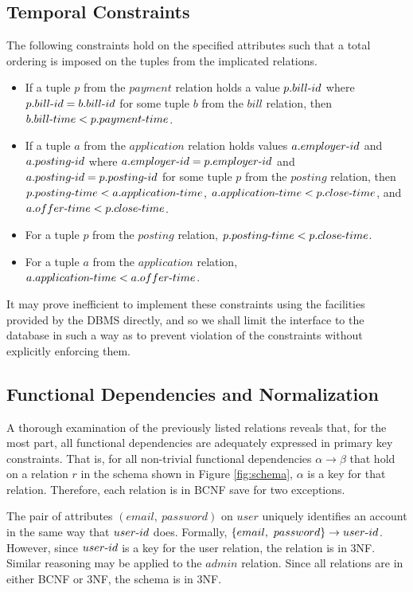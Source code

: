 \documentclass{article}
\newcommand{\tdash}{\textnormal{-}}
\begin{document}
        \subsection{Temporal Constraints} 
            The following constraints hold on the specified attributes such that a total ordering is imposed on the
            tuples from the implicated relations.
            \begin{itemize}
                \item If a tuple $p$ from the $payment$ relation holds a value $p.bill \tdash id$ where $p.bill \tdash
                    id = b.bill \tdash id$ for some tuple $b$ from the $bill$ relation, then $b.bill \tdash time <
                    p.payment \tdash time$.
                \item If a tuple $a$ from the $application$ relation holds values $a.employer \tdash id$ and $a.posting
                    \tdash id$ where $a.employer \tdash id = p.employer \tdash id$ and $a.posting \tdash id = p.posting
                    \tdash id$ for some tuple $p$ from the $posting$ relation, then $p.posting \tdash time <
                    a.application \tdash time$, $a.application \tdash time < p.close \tdash time$, and $a.offer \tdash
                    time < p.close \tdash time$.
                \item For a tuple $p$ from the $posting$ relation, $p.posting \tdash time < p.close \tdash time$.
                \item For a tuple $a$ from the $application$ relation, $a.application \tdash time < a.offer \tdash time$.
            \end{itemize}
            It may prove inefficient to implement these constraints using the facilities provided by the DBMS directly,
            and so we shall limit the interface to the database in such a way as to prevent violation of the
            constraints without explicitly enforcing them.
        \subsection{Functional Dependencies and Normalization}
            A thorough examination of the previously listed relations reveals that, for the most part, all functional
            dependencies are adequately expressed in primary key constraints. That is, for all non-trivial functional
            dependencies $\alpha \rightarrow \beta$ that hold on a relation $r$ in the schema shown in Figure
            \ref{fig:schema}, $\alpha$ is a key for that relation. Therefore, each relation is in BCNF save for two
            exceptions. \par The pair of attributes $(email, \ password)$ on $user$ uniquely identifies an account in
            the same way that $user \tdash id$ does. Formally, $\{email, \ password\} \rightarrow user \tdash id$.
            However, since $user \tdash id$ is a key for the user relation, the relation is in 3NF. Similar reasoning
            may be applied to the $admin$ relation. Since all relations are in either BCNF or 3NF, the schema is in 3NF.
\end{document}
